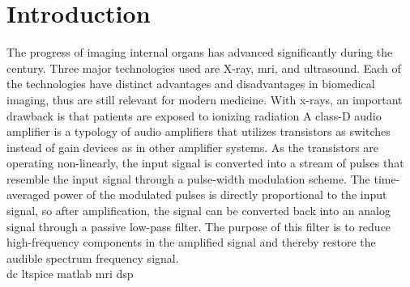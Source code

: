 \chapter{Introduction} \label{cha:introduction}
The progress of imaging internal organs has advanced significantly during the  century. Three major technologies used are X-ray, \gls{mri}, and ultrasound. Each of the technologies have distinct advantages and disadvantages in biomedical imaging, thus are still relevant for modern medicine. With x-rays, an important drawback is that patients are exposed to ionizing radiation 
\cite{ShungUltrasound_Book,Shung1976,JensenUltrasoundBook,Jensen_Algorithms}
\cite{1999_SummerSchool_Notes,Szabo_UltrasoundBook_2}
A class-D audio amplifier is a typology of audio amplifiers that utilizes transistors as switches instead of gain devices as in other amplifier systems. As the transistors are operating non-linearly, the input signal is converted into a stream of pulses that resemble the input signal through a pulse-width modulation scheme. The time-averaged power of the modulated pulses is directly proportional to the input signal, so after amplification, the signal can be converted back into an analog signal through a passive low-pass filter. The purpose of this filter is to reduce high-frequency components in the amplified signal and thereby restore the audible spectrum frequency signal. \\

\gls{dc} \gls{ltspice} \gls{matlab} \gls{mri} \gls{dsp}

%	

%

